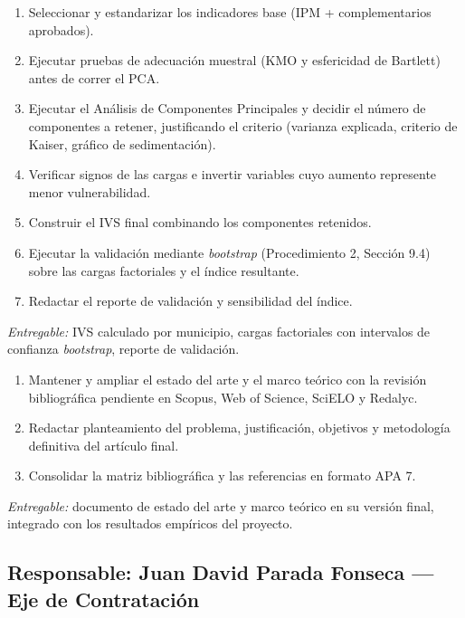 \documentclass[11pt,letterpaper]{article}
\newenvironment{recuadro}[1]{%
  \begin{tcolorbox}[breakable,colback=boxbg,colframe=ustablue,boxrule=0.6pt,arc=1.5pt,
  title={\small\bfseries #1},fonttitle=\small,coltitle=white,colbacktitle=ustablue,
  left=6pt,right=6pt,top=4pt,bottom=4pt]
}{\end{tcolorbox}}
\begin{document}
\begin{recuadro}{Fase 4 completa --- Construcción del Índice de Vulnerabilidad Socioeconómica}
\begin{enumerate}
\item Seleccionar y estandarizar los indicadores base (IPM + complementarios
aprobados).
\item Ejecutar pruebas de adecuación muestral (KMO y esfericidad de Bartlett)
antes de correr el PCA.
\item Ejecutar el Análisis de Componentes Principales y decidir el número de
componentes a retener, justificando el criterio (varianza explicada, criterio
de Kaiser, gráfico de sedimentación).
\item Verificar signos de las cargas e invertir variables cuyo aumento
represente menor vulnerabilidad.
\item Construir el IVS final combinando los componentes retenidos.
\item Ejecutar la validación mediante \textit{bootstrap} (Procedimiento 2,
Sección 9.4) sobre las cargas factoriales y el índice resultante.
\item Redactar el reporte de validación y sensibilidad del índice.
\end{enumerate}
\textit{Entregable:} IVS calculado por municipio, cargas factoriales con
intervalos de confianza \textit{bootstrap}, reporte de validación.
\end{recuadro}

\begin{recuadro}{Transversal --- Redacción teórica y bibliográfica}
\begin{enumerate}
\item Mantener y ampliar el estado del arte y el marco teórico con la revisión
bibliográfica pendiente en Scopus, Web of Science, SciELO y Redalyc.
\item Redactar planteamiento del problema, justificación, objetivos y
metodología definitiva del artículo final.
\item Consolidar la matriz bibliográfica y las referencias en formato APA 7.
\end{enumerate}
\textit{Entregable:} documento de estado del arte y marco teórico en su
versión final, integrado con los resultados empíricos del proyecto.
\end{recuadro}

\subsection{Responsable: Juan David Parada Fonseca --- Eje de Contratación}
\end{document}
